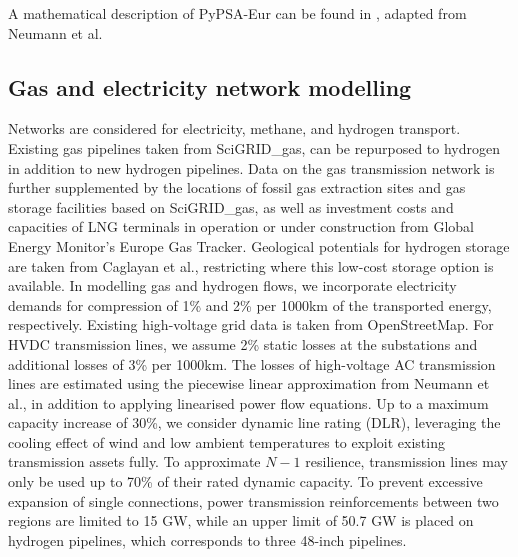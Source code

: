 A mathematical description of PyPSA-Eur can be found in ,
adapted from Neumann et al.\cite{neumannPotentialRoleHydrogen2023}

\subsection*{Gas and electricity network modelling}
\label{sec:methods-networks}

Networks are considered for electricity, methane, and hydrogen transport.
Existing gas pipelines taken from SciGRID\_gas,\cite{plutaSciGRIDGas2022a} can
be repurposed to hydrogen in addition to new hydrogen
pipelines.\cite{neumannPotentialRoleHydrogen2023} Data on the gas transmission
network is further supplemented by the locations of fossil gas extraction sites
and gas storage facilities based on SciGRID\_gas,\cite{plutaSciGRIDGas2022a} as
well as investment costs and capacities of LNG terminals in operation or under
construction from Global Energy Monitor's Europe Gas
Tracker.\cite{globalenergymonitorEuropeGasTracker2024} Geological potentials for
hydrogen storage are taken from Caglayan et
al.,\cite{caglayanTechnicalPotentialSalt2020} restricting where this low-cost
storage option is available. In modelling gas and hydrogen flows, we incorporate
electricity demands for compression of 1\% and 2\% per 1000km of the transported
energy, respectively.\cite{gasforclimateEuropeanHydrogen2021} Existing
high-voltage grid data is taken from
OpenStreetMap.\cite{xiongModellingHighVoltageGrid2024} For HVDC transmission
lines, we assume 2\% static losses at the substations and additional losses of
3\% per 1000km. The losses of high-voltage AC transmission lines are estimated
using the piecewise linear approximation from Neumann et
al.,\cite{neumannAssessmentsLinear2022} in addition to applying linearised power
flow equations.\cite{horschLinearOptimal2018} Up to a maximum capacity increase
of 30\%, we consider dynamic line rating (DLR), leveraging the cooling effect of
wind and low ambient temperatures to exploit existing transmission assets
fully.\cite{glaumLeveragingExisting2023} To approximate $N-1$ resilience,
transmission lines may only be used up to 70\% of their rated dynamic
capacity.\cite{shokrigazafroudiTopologybasedApproximations12022} To prevent
excessive expansion of single connections, power transmission reinforcements
between two regions are limited to 15 GW, while an upper limit of 50.7 GW is
placed on hydrogen pipelines, which corresponds to three 48-inch
pipelines.\cite{gasforclimateEuropeanHydrogen2021}

